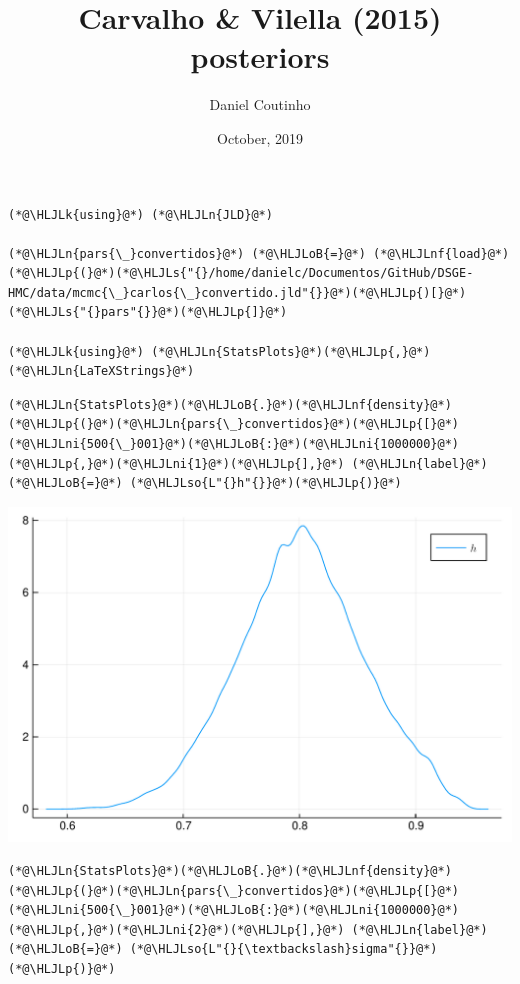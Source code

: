 \documentclass[12pt,a4paper]{article}
\title{ Carvalho & Vilella (2015) posteriors }
\author{ Daniel Coutinho }
\date{ October, 2019 }
\newcommand{\HLJLk}[1]{\textcolor[RGB]{148,91,176}{\textbf{#1}}}
\newcommand{\HLJLn}[1]{#1}
\newcommand{\HLJLnf}[1]{\textcolor[RGB]{66,102,213}{#1}}
\newcommand{\HLJLs}[1]{\textcolor[RGB]{201,61,57}{#1}}
\newcommand{\HLJLso}[1]{\textcolor[RGB]{201,61,57}{#1}}
\newcommand{\HLJLni}[1]{\textcolor[RGB]{59,151,46}{#1}}
\newcommand{\HLJLoB}[1]{\textcolor[RGB]{102,102,102}{\textbf{#1}}}
\newcommand{\HLJLp}[1]{#1}
\begin{document}
\maketitle


\begin{lstlisting}
(*@\HLJLk{using}@*) (*@\HLJLn{JLD}@*)

(*@\HLJLn{pars{\_}convertidos}@*) (*@\HLJLoB{=}@*) (*@\HLJLnf{load}@*)(*@\HLJLp{(}@*)(*@\HLJLs{"{}/home/danielc/Documentos/GitHub/DSGE-HMC/data/mcmc{\_}carlos{\_}convertido.jld"{}}@*)(*@\HLJLp{)[}@*)(*@\HLJLs{"{}pars"{}}@*)(*@\HLJLp{]}@*)

(*@\HLJLk{using}@*) (*@\HLJLn{StatsPlots}@*)(*@\HLJLp{,}@*) (*@\HLJLn{LaTeXStrings}@*)
\end{lstlisting}


\begin{lstlisting}
(*@\HLJLn{StatsPlots}@*)(*@\HLJLoB{.}@*)(*@\HLJLnf{density}@*)(*@\HLJLp{(}@*)(*@\HLJLn{pars{\_}convertidos}@*)(*@\HLJLp{[}@*)(*@\HLJLni{500{\_}001}@*)(*@\HLJLoB{:}@*)(*@\HLJLni{1000000}@*)(*@\HLJLp{,}@*)(*@\HLJLni{1}@*)(*@\HLJLp{],}@*) (*@\HLJLn{label}@*)(*@\HLJLoB{=}@*) (*@\HLJLso{L"{}h"{}}@*)(*@\HLJLp{)}@*)
\end{lstlisting}

\includegraphics[width=\linewidth]{figures/carlos_mcmc_2_1.pdf}

\begin{lstlisting}
(*@\HLJLn{StatsPlots}@*)(*@\HLJLoB{.}@*)(*@\HLJLnf{density}@*)(*@\HLJLp{(}@*)(*@\HLJLn{pars{\_}convertidos}@*)(*@\HLJLp{[}@*)(*@\HLJLni{500{\_}001}@*)(*@\HLJLoB{:}@*)(*@\HLJLni{1000000}@*)(*@\HLJLp{,}@*)(*@\HLJLni{2}@*)(*@\HLJLp{],}@*) (*@\HLJLn{label}@*)(*@\HLJLoB{=}@*) (*@\HLJLso{L"{}{\textbackslash}sigma"{}}@*)(*@\HLJLp{)}@*)
\end{lstlisting}
\end{document}
